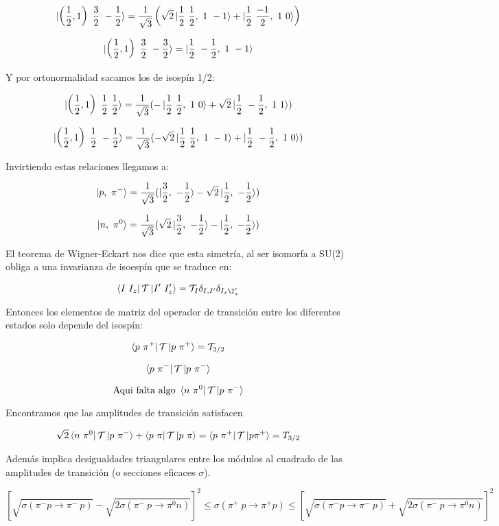\documentclass{article}
\begin{document}
$$\ket{\left ( \frac{1}{2},1\right) \ \frac{3}{2} \ -\frac{1}{2}}= \frac{1}{\sqrt{3}}\left ( \sqrt{2} \ket{\frac{1}{2} \ \frac{1}{2}, \ 1 \ -1} + \ket{\frac{1}{2} \ \frac{-1}{2} , \ 1 \ 0}\right)$$

$$\ket{\left ( \frac{1}{2},1\right) \ \frac{3}{2} \ -\frac{3}{2}}=\ket{\frac{1}{2} \ -\frac{1}{2} , \ 1 \ -1}$$

Y por ortonormalidad sacamos los de isospín 1/2:

$$\ket{\left ( \frac{1}{2},1\right) \ \frac{1}{2} \ \frac{1}{2}}= \frac{1}{\sqrt{3}}(-\ket{\frac{1}{2} \ \frac{1}{2} ,\ 1 \ 0} + \sqrt{2} \ket{\frac{1}{2} \ -\frac{1}{2} ,\ 1 \ 1})$$

$$\ket{\left ( \frac{1}{2},1\right) \ \frac{1}{2} \ -\frac{1}{2}}= \frac{1}{\sqrt{3}}(-\sqrt{2}\ket{\frac{1}{2} \ \frac{1}{2} ,\ 1 \ -1} + \ket{\frac{1}{2} \ -\frac{1}{2} ,\ 1 \ 0})$$

Invirtiendo estas relaciones llegamos a:

$$\ket{p, \ \pi ^-}=\frac{1}{\sqrt{3}}(\ket{\frac{3}{2},\ -\frac{1}{2}} - \sqrt{2} \ket{\frac{1}{2}, \ -\frac{1}{2}})$$

$$\ket{n, \ \pi ^0}=\frac{1}{\sqrt{3}}(\sqrt{2}\ket{\frac{3}{2},\ -\frac{1}{2}} -\ket{\frac{1}{2}, \ -\frac{1}{2}})$$

El teorema de Wigner-Eckart nos dice que esta simetría, al ser isomorfa a SU(2) obliga a una invarianza de isoespín que se traduce en:

$$\bra{I \ I_z}\mathcal{T}\ket{I' \ I'_z}=\mathcal{T}_I \delta _{I, I'}\delta _{I_z \I_z'}$$

Entonces los elementos de matriz del operador de transición entre los diferentes estados solo depende del isospín:

$$\bra{p \ \pi ^+}\mathcal{T}\ket{p \ \pi ^+}=\mathcal{T}_{3/2}$$

$$\bra{p \ \pi ^-}\mathcal{T}\ket{p \ \pi ^-}$$


$$\text{Aqui falta algo }\bra{n \ \pi ^0}\mathcal{T}\ket{p \ \pi ^-}$$

Encontramos que las amplitudes de transición satisfacen

$$\sqrt{2} \bra{n \ \pi ^0}\mathcal{T}\ket{p \ \pi ^-} + \bra{p \ \pi}\mathcal{T}\ket{p \ \pi}=\bra{p \ \pi ^+} \mathcal{T} \ket{p \pi ^+} = T_{3/2}$$

Además implica desigualdades triangulares entre los módulos al cuadrado de las amplitudes de transición (o secciones eficaces $\sigma$).

$$[\sqrt{\sigma (\pi ^-p \to \pi ^- \ p)} - \sqrt{2\sigma (\pi ^- \ p \to \pi ^0 n)}]^2\leq \sigma (\pi ^+ \ p \to \pi ^+ p) \leq [\sqrt{\sigma (\pi ^- p \to \pi ^- \ p)} + \sqrt{2\sigma (\pi ^- \ p \to \pi ^0 n)}]^2$$
\end{document}
